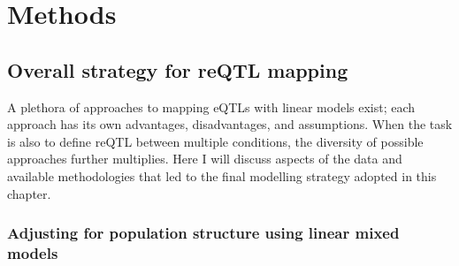 \section{Methods}
\label{sec:hird_reQTL_methods}

\subsection{Overall strategy for reQTL mapping}
\label{subsec:hird_reQTL_overall_strategy}

A plethora of approaches to mapping \glspl{eQTL} with linear models exist; each approach has its own advantages, disadvantages, and assumptions.
When the task is also to define \gls{reQTL} between multiple conditions, the diversity of possible approaches further multiplies.
Here I will discuss aspects of the data and available methodologies that led to the final modelling strategy adopted in this chapter.

\subsubsection{Adjusting for population structure using linear mixed models}

